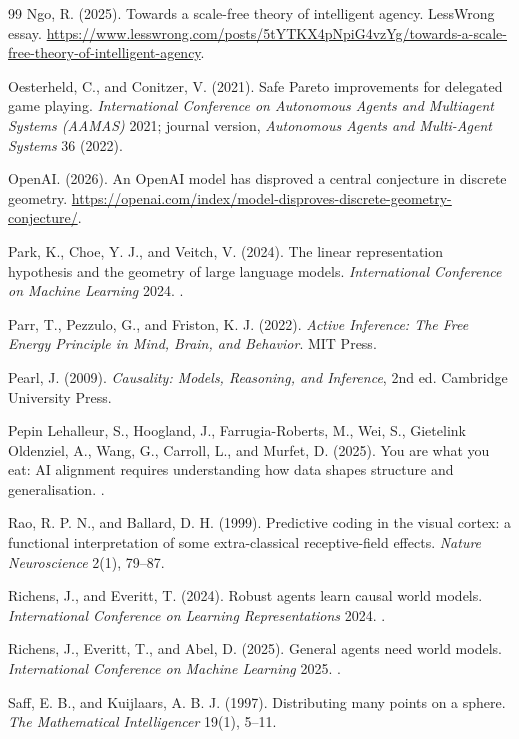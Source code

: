 \begin{thebibliography}{99}
 Ngo, R. (2025). Towards a scale-free theory of intelligent agency. LessWrong essay. \url{https://www.lesswrong.com/posts/5tYTKX4pNpiG4vzYg/towards-a-scale-free-theory-of-intelligent-agency}.

 Oesterheld, C., and Conitzer, V. (2021). Safe Pareto improvements for delegated game playing. \emph{International Conference on Autonomous Agents and Multiagent Systems (AAMAS)} 2021; journal version, \emph{Autonomous Agents and Multi-Agent Systems} 36 (2022).

 OpenAI. (2026). An OpenAI model has disproved a central conjecture in discrete geometry. \url{https://openai.com/index/model-disproves-discrete-geometry-conjecture/}.

 Park, K., Choe, Y. J., and Veitch, V. (2024). The linear representation hypothesis and the geometry of large language models. \emph{International Conference on Machine Learning} 2024. .

 Parr, T., Pezzulo, G., and Friston, K. J. (2022). \emph{Active Inference: The Free Energy Principle in Mind, Brain, and Behavior}. MIT Press.

 Pearl, J. (2009). \emph{Causality: Models, Reasoning, and Inference}, 2nd ed. Cambridge University Press.

 Pepin Lehalleur, S., Hoogland, J., Farrugia-Roberts, M., Wei, S., Gietelink Oldenziel, A., Wang, G., Carroll, L., and Murfet, D. (2025). You are what you eat: AI alignment requires understanding how data shapes structure and generalisation. .

 Rao, R. P. N., and Ballard, D. H. (1999). Predictive coding in the visual cortex: a functional interpretation of some extra-classical receptive-field effects. \emph{Nature Neuroscience} 2(1), 79--87.


 Richens, J., and Everitt, T. (2024). Robust agents learn causal world models. \emph{International Conference on Learning Representations} 2024. .


 Richens, J., Everitt, T., and Abel, D. (2025). General agents need world models. \emph{International Conference on Machine Learning} 2025. .

 Saff, E. B., and Kuijlaars, A. B. J. (1997). Distributing many points on a sphere. \emph{The Mathematical Intelligencer} 19(1), 5--11.



\end{thebibliography}
